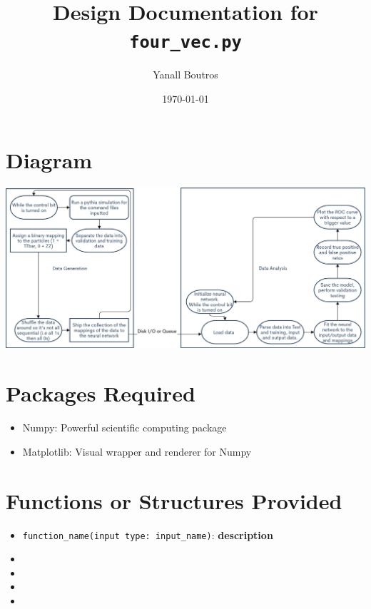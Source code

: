 \documentclass{article}
\begin{document}
\title{Design Documentation for \texttt{four\_vec.py}}
\author{Yanall Boutros}
\date{\today}
\maketitle
\section*{Diagram}
\begin{center}
\includegraphics[scale=0.2]{f.png}
\end{center}
\section*{Packages Required}
\begin{itemize}
  \item Numpy:      Powerful scientific computing package
  \item Matplotlib: Visual wrapper and renderer for Numpy
\end{itemize}
\section*{Functions or Structures Provided}
\begin{itemize}
  \item \texttt{function\_name(input type: input\_name)}:
    \textbf{description}
  \item 
  \item
  \item
  \item
\end{itemize}
\end{document}
